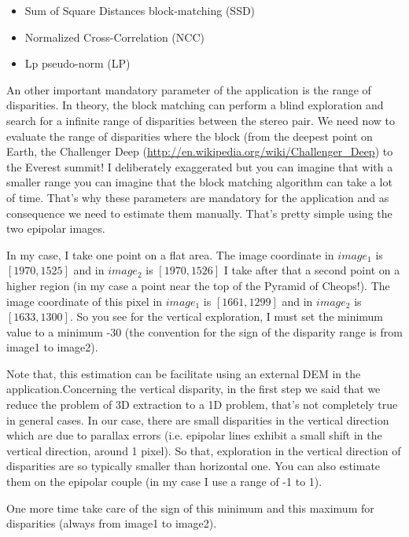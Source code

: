 \begin{itemize}
\item Sum of Square Distances block-matching (SSD)
\item Normalized Cross-Correlation (NCC)
\item Lp pseudo-norm (LP)
\end{itemize}

An other important mandatory parameter of the application is the range of
disparities. In theory, the block matching can perform a blind exploration and
search for a infinite range of disparities between the stereo pair. We need now
to evaluate the range of disparities where the block (from the deepest point on
Earth, the Challenger Deep (\url{http://en.wikipedia.org/wiki/Challenger_Deep})
to the Everest summit!  I deliberately exaggerated but you can imagine that with
a smaller range you can imagine that the block matching algorithm can take a lot
of time.  That's why these parameters are mandatory for the application and as
consequence we need to estimate them manually. That's pretty simple using the
two epipolar images.

In my case, I take one point on a flat area. The image coordinate in $image_{1}$
is $[1970,1525]$ and in $image_{2}$ is $[1970,1526]$ I take after that a second
point on a higher region (in my case a point near the top of the Pyramid of
Cheops!). The image coordinate of this pixel in $image_{1}$ is $[1661,1299]$ and
in $image_{2}$ is $[1633,1300]$.  So you see for the vertical exploration, I
must set the minimum value to a minimum -30 (the convention for the sign of the
disparity range is from image1 to image2).

Note that, this estimation can be facilitate using an external DEM in the
 application.Concerning the
vertical disparity, in the first step we said that we reduce the problem of 3D
extraction to a 1D problem, that's not completely true in general cases. In our
case, there are small disparities in the vertical direction which are due to
parallax errors (i.e. epipolar lines exhibit a small shift in the vertical
direction, around 1 pixel). So that, exploration in the vertical direction of
disparities are so typically smaller than horizontal one. You can also estimate
them on the epipolar couple (in my case I use a range of -1 to 1).

One more time take care of the sign of this minimum and this maximum for
disparities (always from image1 to image2).

